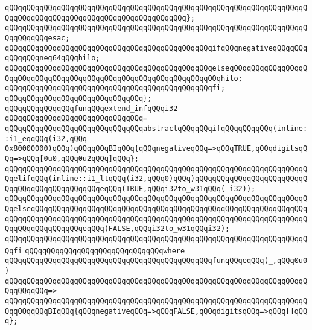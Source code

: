 \verb|qQQqqQQqqQQqqQQqqQQqqQQqqQQqqQQqqQQqqQQqqQQqqQQqqQQqqQQqqQQqqQQqqQQqqQQqqQQqqQQqqQQqqQQqqQQqqQQqqQQqqQQqqQQqqQQq};|\newline
\verb|qQQqqQQqqQQqqQQqqQQqqQQqqQQqqQQqqQQqqQQqqQQqqQQqqQQqqQQqqQQqqQQqqQQqqQQqqQQqqQQqesac;|\newline
\newline
\verb|qQQqqQQqqQQqqQQqqQQqqQQqqQQqqQQqqQQqqQQqqQQqqQQqifqQQqnegativeqQQqqQQqqQQqqQQqneg64qQQqhilo;|\newline
\verb|qQQqqQQqqQQqqQQqqQQqqQQqqQQqqQQqqQQqqQQqqQQqqQQqelseqQQqqQQqqQQqqQQqqQQqqQQqqQQqqQQqqQQqqQQqqQQqqQQqqQQqqQQqqQQqqQQqqQQqhilo;|\newline
\verb|qQQqqQQqqQQqqQQqqQQqqQQqqQQqqQQqqQQqqQQqqQQqqQQqfi;|\newline
\verb|qQQqqQQqqQQqqQQqqQQqqQQqqQQqqQQq};|\newline
\newline
\verb|qQQqqQQqqQQqqQQqfunqQQqextend_infqQQqi32|\newline
\verb|qQQqqQQqqQQqqQQqqQQqqQQqqQQqqQQq=|\newline
\verb|qQQqqQQqqQQqqQQqqQQqqQQqqQQqqQQqabstractqQQqqQQqifqQQqqQQqqQQq(inline::i1_eqqQQq(i32,qQQq-0x80000000)qQQq)qQQqqQQqBIqQQq{qQQqnegativeqQQq=>qQQqTRUE,qQQqdigitsqQQq=>qQQq[0u0,qQQq0u2qQQq]qQQq};|\newline
\verb|qQQqqQQqqQQqqQQqqQQqqQQqqQQqqQQqqQQqqQQqqQQqqQQqqQQqqQQqqQQqqQQqqQQqqQQqelifqQQq(inline::i1_ltqQQq(i32,qQQq0)qQQq)qQQqqQQqqQQqqQQqqQQqqQQqqQQqqQQqqQQqqQQqqQQqqQQqeqQQq(TRUE,qQQqi32to_w31qQQq(-i32));|\newline
\verb|qQQqqQQqqQQqqQQqqQQqqQQqqQQqqQQqqQQqqQQqqQQqqQQqqQQqqQQqqQQqqQQqqQQqqQQqelseqQQqqQQqqQQqqQQqqQQqqQQqqQQqqQQqqQQqqQQqqQQqqQQqqQQqqQQqqQQqqQQqqQQqqQQqqQQqqQQqqQQqqQQqqQQqqQQqqQQqqQQqqQQqqQQqqQQqqQQqqQQqqQQqqQQqqQQqqQQqqQQqqQQqqQQqeqQQq(FALSE,qQQqi32to_w31qQQqi32);|\newline
\verb|qQQqqQQqqQQqqQQqqQQqqQQqqQQqqQQqqQQqqQQqqQQqqQQqqQQqqQQqqQQqqQQqqQQqqQQqfi|\newline
\verb|qQQqqQQqqQQqqQQqqQQqqQQqqQQqqQQqwhere|\newline
\verb|qQQqqQQqqQQqqQQqqQQqqQQqqQQqqQQqqQQqqQQqqQQqqQQqfunqQQqeqQQq(_,qQQq0u0)|\newline
\verb|qQQqqQQqqQQqqQQqqQQqqQQqqQQqqQQqqQQqqQQqqQQqqQQqqQQqqQQqqQQqqQQqqQQqqQQqqQQqqQQq=>|\newline
\verb|qQQqqQQqqQQqqQQqqQQqqQQqqQQqqQQqqQQqqQQqqQQqqQQqqQQqqQQqqQQqqQQqqQQqqQQqqQQqqQQqBIqQQq{qQQqnegativeqQQq=>qQQqFALSE,qQQqdigitsqQQq=>qQQq[]qQQq};|\newline
